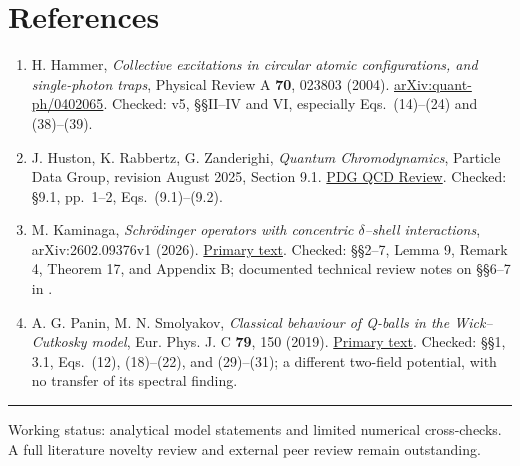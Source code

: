\documentclass[a4paper,11pt]{article}
\begin{document}
\section*{References}
\begin{enumerate}
\renewcommand{\labelenumi}{[\theenumi]}
\item H. Hammer, \emph{Collective excitations in circular atomic configurations, and single-photon traps}, Physical Review A \textbf{70}, 023803 (2004). \href{https://arxiv.org/abs/quant-ph/0402065}{arXiv:quant-ph/0402065}. Checked: v5, \S\S II--IV and VI, especially Eqs.~(14)--(24) and (38)--(39).
\item J. Huston, K. Rabbertz, G. Zanderighi, \emph{Quantum Chromodynamics}, Particle Data Group, revision August 2025, Section 9.1. \href{https://pdg.lbl.gov/2025/reviews/rpp2025-rev-qcd.pdf}{PDG QCD Review}. Checked: \S9.1, pp.~1--2, Eqs.~(9.1)--(9.2).
\item M. Kaminaga, \emph{Schr\"odinger operators with concentric $\delta$--shell interactions}, arXiv:2602.09376v1 (2026). \href{https://arxiv.org/html/2602.09376v1}{Primary text}. Checked: \S\S2--7, Lemma 9, Remark 4, Theorem 17, and Appendix B; documented technical review notes on \S\S6--7 in .
\item A. G. Panin, M. N. Smolyakov, \emph{Classical behaviour of Q-balls in the Wick--Cutkosky model}, Eur. Phys. J. C \textbf{79}, 150 (2019). \href{https://link.springer.com/article/10.1140/epjc/s10052-019-6638-2}{Primary text}. Checked: \S\S1, 3.1, Eqs.~(12), (18)--(22), and (29)--(31); a different two-field potential, with no transfer of its spectral finding.
\end{enumerate}

\bigskip\hrule\medskip
{\small Working status: analytical model statements and limited numerical cross-checks. A full literature novelty review and external peer review remain outstanding.}
\end{document}
